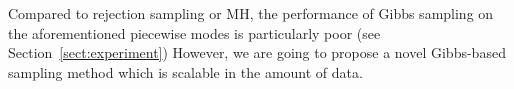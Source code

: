 Compared to rejection sampling or MH, the performance of Gibbs sampling on the aforementioned piecewise modes is particularly poor (see Section~\ref{sect:experiment})
However,  we are going to propose a novel Gibbs-based sampling method which is scalable in the amount of data.


